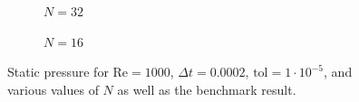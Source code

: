\begin{figure}[p]
    \vspace{1cm}
    
    \begin{subfigure}[b]{0.49\textwidth}
	    \caption{$N = 32$}
    	\label{fig:pressuree}
    \end{subfigure}
    \begin{subfigure}[b]{0.49\textwidth}
	    \caption{$N = 16$}
	    \label{fig:pressuref}
    \end{subfigure}
    \caption{Static pressure for $\text{Re} = 1000$, $\Delta t = 0.0002$, $\text{tol} = 1 \cdot 10^{-5}$, and various values of $N$ as well as the benchmark result.}
    \label{fig:allpressure}
\end{figure}
